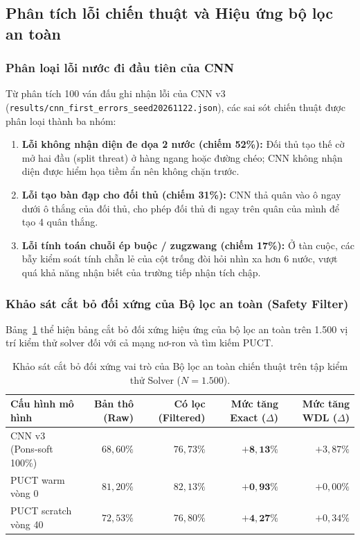 \documentclass[11pt, a4paper]{article}
\begin{document}
\subsection{Phân tích lỗi chiến thuật và Hiệu ứng bộ lọc an toàn}
\subsubsection{Phân loại lỗi nước đi đầu tiên của CNN}
Từ phân tích 100 ván đấu ghi nhận lỗi của CNN v3 (\texttt{results/cnn\_first\_errors\_seed20261122.json}), các sai sót chiến thuật được phân loại thành ba nhóm:
\begin{enumerate}
    \item \textbf{Lỗi không nhận diện đe dọa 2 nước (chiếm 52\%):} Đối thủ tạo thế cờ mở hai đầu (split threat) ở hàng ngang hoặc đường chéo; CNN không nhận diện được hiểm họa tiềm ẩn nên không chặn trước.
    \item \textbf{Lỗi tạo bàn đạp cho đối thủ (chiếm 31\%):} CNN thả quân vào ô ngay dưới ô thắng của đối thủ, cho phép đối thủ đi ngay trên quân của mình để tạo 4 quân thắng.
    \item \textbf{Lỗi tính toán chuỗi ép buộc / zugzwang (chiếm 17\%):} Ở tàn cuộc, các bẫy kiểm soát tính chẵn lẻ của cột trống đòi hỏi nhìn xa hơn 6 nước, vượt quá khả năng nhận biết của trường tiếp nhận tích chập.
\end{enumerate}

\subsubsection{Khảo sát cắt bỏ đối xứng của Bộ lọc an toàn (Safety Filter)}
Bảng~\ref{tab:safety_filter_ablation} thể hiện bảng cắt bỏ đối xứng hiệu ứng của bộ lọc an toàn trên 1.500 vị trí kiểm thử solver đối với cả mạng nơ-ron và tìm kiếm PUCT.

\begin{table}[H]
    \centering
    \caption{Khảo sát cắt bỏ đối xứng vai trò của Bộ lọc an toàn chiến thuật trên tập kiểm thử Solver ($N = 1.500$).}
    \label{tab:safety_filter_ablation}
    \begin{tabular}{@{} l r r r r @{}}
        \toprule
        \textbf{Cấu hình mô hình} & \textbf{Bản thô (Raw)} & \textbf{Có lọc (Filtered)} & \textbf{Mức tăng Exact ($\Delta$)} & \textbf{Mức tăng WDL ($\Delta$)} \\
        \midrule
        CNN v3 (Pons-soft 100\%) & $68{,}60\%$ & $76{,}73\%$ & $\mathbf{+8{,}13\%}$ & $+3{,}87\%$ \\
        PUCT warm vòng 0 & $81{,}20\%$ & $82{,}13\%$ & $\mathbf{+0{,}93\%}$ & $+0{,}00\%$ \\
        PUCT scratch vòng 40 & $72{,}53\%$ & $76{,}80\%$ & $\mathbf{+4{,}27\%}$ & $+0{,}34\%$ \\
        \bottomrule
    \end{tabular}
\end{table}
\end{document}
